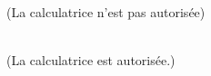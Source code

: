 \documentclass[12pt,a4paper]{article}
\begin{document}
\renewcommand{\labelitemi}{\textbullet}

\begin{center}
    {\Large{}} \\
    (La calculatrice n'est pas autorisée)
\end{center}


\newpage
\begin{center}
    {\Large{}}\\
    (La calculatrice est autorisée.)
\end{center}

\setcounter{exercice}{0}




\end{document}
